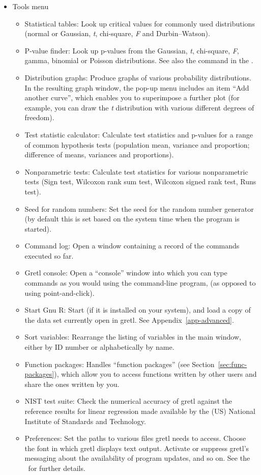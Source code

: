 \begin{itemize}
\item \textsf{Tools menu}
  \begin{itemize}
  \item \textsf{Statistical tables}: Look up critical values for
    commonly used distributions (normal or Gaussian, \emph{t},
    chi-square, \emph{F} and Durbin--Watson).
  \item \textsf{P-value finder}: Look up p-values from the Gaussian,
    \emph{t}, chi-square, \emph{F}, gamma, binomial or Poisson
    distributions. See also the  command in the \GCR.
  \item \textsf{Distribution graphs}: Produce graphs of various
    probability distributions.  In the resulting graph window,
    the pop-up menu includes an item ``Add another curve'', which
    enables you to superimpose a further plot (for example, you
    can draw the \emph{t} distribution with various different degrees
    of freedom).
  \item \textsf{Test statistic calculator}: Calculate test statistics
    and p-values for a range of common hypothesis tests (population
    mean, variance and proportion; difference of means, variances and
    proportions).  
  \item \textsf{Nonparametric tests}: Calculate test statistics
    for various nonparametric tests (Sign test, Wilcoxon rank sum
    test, Wilcoxon signed rank test, Runs test).
  \item \textsf{Seed for random numbers}: Set the seed for the random
    number generator (by default this is set based on the system time
    when the program is started).
  \item \textsf{Command log}: Open a window containing a record
    of the commands executed so far.
  \item \textsf{Gretl console}: Open a ``console'' window into which
    you can type commands as you would using the command-line program,
     (as opposed to using point-and-click).
  \item \textsf{Start Gnu R}: Start  (if it is installed on
    your system), and load a copy of the data set currently open in
    gretl.  See Appendix~\ref{app-advanced}.
  \item \textsf{Sort variables}: Rearrange the listing of variables in
    the main window, either by ID number or alphabetically by name.
  \item \textsf{Function packages}: Handles ``function packages'' (see
    Section~\ref{sec:func-packages}), which allow you to access
    functions written by other users and share the ones written by
    you.
  \item \textsf{NIST test suite}: Check the numerical accuracy of
    gretl against the reference results for linear regression
    made available by the (US) National Institute of Standards and
    Technology.
  \item \textsf{Preferences}: Set the paths to various files
    gretl needs to access. Choose the font in which gretl
    displays text output.  Activate or suppress gretl's
    messaging about the availability of program updates, and so on.
    See the \GCR\ for further details.
  \end{itemize}


\end{itemize}
